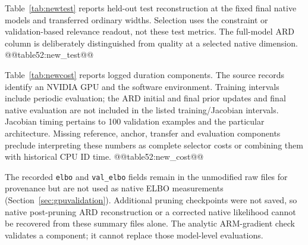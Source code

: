 Table~\ref{tab:newtest} reports held-out test reconstruction at the
fixed final native models and transferred ordinary widths. Selection
uses the constraint or validation-based relevance readout, not these
test metrics. The full-model ARD column is deliberately distinguished
from quality at a selected native dimension.
@@table52:new_test@@

Table~\ref{tab:newcost} reports logged duration components. The source
records identify an NVIDIA GPU and the software environment. Training
intervals include periodic evaluation; the ARD initial and final prior
updates and final native evaluation are not included in the listed
training/Jacobian intervals. Jacobian timing pertains to 100 validation
examples and the particular architecture. Missing reference, anchor,
transfer and evaluation components preclude interpreting these numbers
as complete selector costs or combining them with historical CPU ID time.
@@table52:new_cost@@

The recorded \texttt{elbo} and \texttt{val\_elbo} fields remain in the
unmodified raw files for provenance but are not used as native ELBO
measurements (Section~\ref{sec:gpuvalidation}). Additional pruning
checkpoints were not saved, so native post-pruning ARD reconstruction
or a corrected native likelihood cannot be recovered from these
summary files alone. The analytic ARM-gradient check validates a
component; it cannot replace those model-level evaluations.

